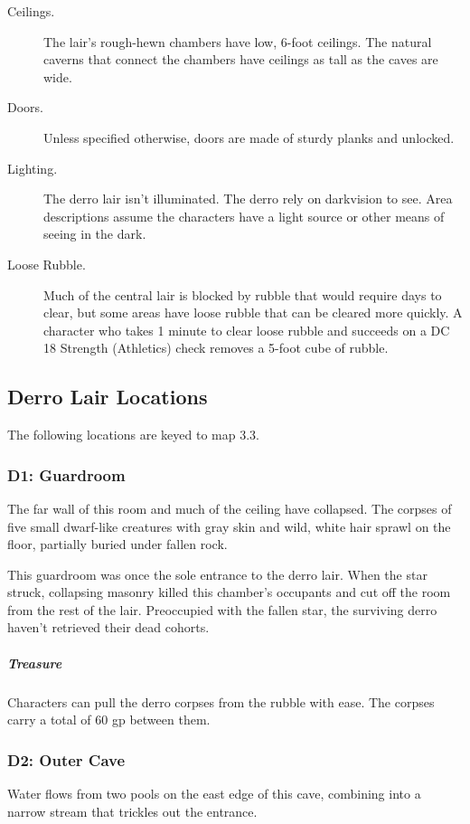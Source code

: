 \documentclass[10pt,a4paper,twoside,bg=print,twocolumn,openany,nodeprecatedcode]{dndbook}
\begin{document}
\begin{description}
\item[Ceilings.]
The lair's rough-hewn chambers have low, 6-foot ceilings. The natural caverns that connect the chambers have ceilings as tall as the caves are wide.
\item[Doors.]
Unless specified otherwise, doors are made of sturdy planks and unlocked.
\item[Lighting.]
The derro lair isn't illuminated. The derro rely on darkvision to see. Area descriptions assume the characters have a light source or other means of seeing in the dark.
\item[Loose Rubble.]
Much of the central lair is blocked by rubble that would require days to clear, but some areas have loose rubble that can be cleared more quickly. A character who takes 1 minute to clear loose rubble and succeeds on a DC 18 Strength (Athletics) check removes a 5-foot cube of rubble.
\end{description}

\subsection{Derro Lair Locations}
The following locations are keyed to map 3.3.

\subsubsection{D1: Guardroom}
\begin{DndReadAloud}{}
The far wall of this room and much of the ceiling have collapsed. The corpses of five small dwarf-like creatures with gray skin and wild, white hair sprawl on the floor, partially buried under fallen rock.

\end{DndReadAloud}

This guardroom was once the sole entrance to the derro lair. When the star struck, collapsing masonry killed this chamber's occupants and cut off the room from the rest of the lair. Preoccupied with the fallen star, the surviving derro haven't retrieved their dead cohorts.

\subparagraph{Treasure}
Characters can pull the derro corpses from the rubble with ease. The corpses carry a total of 60 gp between them.

\subsubsection{D2: Outer Cave}
\begin{DndReadAloud}{}
Water flows from two pools on the east edge of this cave, combining into a narrow stream that trickles out the entrance.

\end{DndReadAloud}
\end{document}
